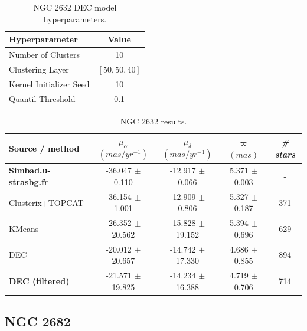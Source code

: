 \documentclass[11pt, a4paper, english]{book}
\begin{document}
\newpage

\vfill

\begin{table}[h!]
  \begin{center}
    \begin{tabular}{l|c}
      \textbf{Hyperparameter} & \textbf{Value} \\
      \hline
      Number of Clusters & 10 \\
      Clustering Layer & $\left[ 50, 50, 40 \right]$ \\
      Kernel Initializer Seed & 10 \\
      Quantil Threshold & 0.1 \\
    \end{tabular}
    \caption{NGC 2632 DEC model hyperparameters.}
    \label{tab:hyperparameters_ngc_2632}
  \end{center}
\end{table}

\begin{table}[h!]
  \begin{center}
    \begin{tabular}{l|c|c|c|c}
      \textbf{Source / method} & \textbf{$\mu_{\alpha}$ $(mas/yr^{-1})$} & \textbf{$\mu_{\delta}$ $(mas/yr^{-1})$} & \textbf{$\varpi$ $(mas)$} & \emph{\# stars} \\
      \hline
      \textbf{Simbad.u-strasbg.fr} & -36.047 $\pm$ 0.110 & -12.917 $\pm$ 0.066 & 5.371 $\pm$ 0.003 & - \\
      Clusterix+TOPCAT & -36.154 $\pm$ 1.001 & -12.909 $\pm$ 0.806 & 5.327 $\pm$ 0.187 & 371 \\
      KMeans & -26.352 $\pm$ 20.562 & -15.828 $\pm$ 19.152 & 5.394 $\pm$ 0.696 & 629 \\
      DEC & -20.012 $\pm$ 20.657 & -14.742 $\pm$ 17.330 & 4.686 $\pm$ 0.855 & 894 \\
      \textbf{DEC (filtered)} & -21.571 $\pm$ 19.825 & -14.234 $\pm$ 16.388 & 4.719 $\pm$ 0.706 & 714 \\
    \end{tabular}
    \caption{NGC 2632 results.}
    \label{tab:results_ngc_2632}
  \end{center}
\end{table}

\vfill

\newpage

\subsection{NGC 2682}
\end{document}
